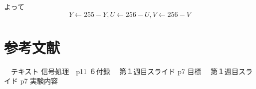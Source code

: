 \documentclass[a4j]{jsarticle}
\begin{document}
よって
\begin{equation*}
  Y ← 255 -Y, U ← 256 -U, V ← 256 -V
\end{equation*}

\section{参考文献}
\begin{thebibliography}{99}
  　テキスト 信号処理　p11 ６付録
  　第１週目スライド p7 目標
  　第１週目スライド p7 実験内容
\end{thebibliography}
\end{document}
